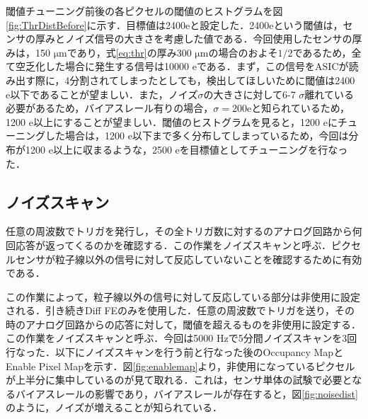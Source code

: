 閾値チューニング前後の各ピクセルの閾値のヒストグラムを図\ref{fig:ThrDistBefore}に示す．目標値は2400$\mathrm{e}$と設定した．2400$\mathrm{e}$という閾値は，センサの厚みとノイズ信号の大きさを考慮した値である．今回使用したセンサの厚みは，150 $\mathrm{\mu m}$であり，式\ref{eq:thr}の厚み300 $\mathrm{\mu m}$の場合のおよそ$1/2$であるため，全て空乏化した場合に発生する信号は10000 $\mathrm{e}$である．まず，この信号をASICが読み出す際に，4分割されてしまったとしても，検出してほしいために閾値は2400 $\mathrm{e}$以下であることが望ましい．また，ノイズ$\sigma$の大きさに対して6-7 $\sigma$離れている必要があるため，バイアスレール有りの場合，$\sigma = 200 \mathrm{e}$と知られているため，1200 $\mathrm{e}$以上にすることが望ましい．閾値のヒストグラムを見ると，1200 $\mathrm{e}$にチューニングした場合は，1200 $\mathrm{e}$以下まで多く分布してしまっているため，今回は分布が1200 $\mathrm{e}$以上に収まるような，2500 $\mathrm{e}$を目標値としてチューニングを行なった．

\subsection{ノイズスキャン}
任意の周波数でトリガを発行し，その全トリガ数に対するのアナログ回路から何回応答が返ってくるのかを確認する．この作業をノイズスキャンと呼ぶ．ピクセルセンサが粒子線以外の信号に対して反応していないことを確認するために有効である．\par
この作業によって，粒子線以外の信号に対して反応している部分は非使用に設定される．引き続きDiff FEのみを使用した．任意の周波数でトリガを送り，その時のアナログ回路からの応答に対して，閾値を超えるものを非使用に設定する．この作業をノイズスキャンと呼ぶ．今回は5000 $\mathrm{Hz}$で5分間ノイズスキャンを3回行なった．以下にノイズスキャンを行う前と行なった後のOccupancy MapとEnable Pixel Mapを示す．図\ref{fig:enablemap}より，非使用になっているピクセルが上半分に集中しているのが見て取れる．これは，センサ単体の試験で必要となるバイアスレールの影響であり，バイアスレールが存在すると，図\ref{fig:noisedist}のように，ノイズが増えることが知られている．

